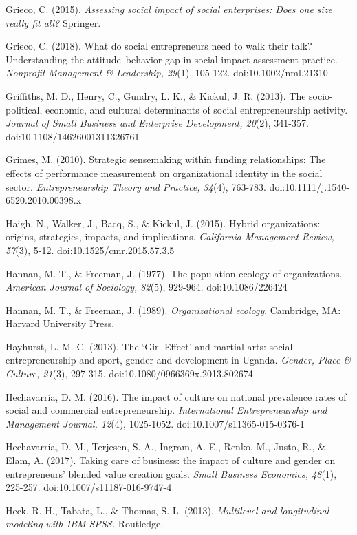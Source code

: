 \documentclass{article}
\begin{document}
Grieco, C. (2015). \emph{Assessing social impact of social enterprises: Does one size really fit all?} Springer.

Grieco, C. (2018). What do social entrepreneurs need to walk their talk? Understanding the attitude--behavior gap in social impact assessment practice. \emph{Nonprofit}\emph{ Management \& Leadership, 29}(1), 105-122. doi:10.1002/nml.21310

Griffiths, M. D., Henry, C., Gundry, L. K., \& Kickul, J. R. (2013). The socio-political, economic, and cultural determinants of social entrepreneurship activity. \emph{Journal of Small Business and Enterprise Development, 20}(2), 341-357. doi:10.1108/14626001311326761

Grimes, M. (2010). Strategic sensemaking within funding relationships: The effects of performance measurement on organizational identity in the social sector. \emph{Entrepreneurship Theory and Practice, 34}(4), 763-783. doi:10.1111/j.1540-6520.2010.00398.x

Haigh, N., Walker, J., Bacq, S., \& Kickul, J. (2015). Hybrid organizations: origins, strategies, impacts, and implications. \emph{California Management Review, 57}(3), 5-12. doi:10.1525/cmr.2015.57.3.5

Hannan, M. T., \& Freeman, J. (1977). The population ecology of organizations. \emph{American Journal of Sociology, 82}(5), 929-964. doi:10.1086/226424

Hannan, M. T., \& Freeman, J. (1989). \emph{Organizational ecology}. Cambridge, MA: Harvard University Press.

Hayhurst, L. M. C. (2013). The ‘Girl Effect' and martial arts: social entrepreneurship and sport, gender and development in Uganda. \emph{Gender, Place \& Culture, 21}(3), 297-315. doi:10.1080/0966369x.2013.802674

Hechavarría, D. M. (2016). The impact of culture on national prevalence rates of social and commercial entrepreneurship. \emph{International Entrepreneurship and Management Journal, 12}(4), 1025-1052. doi:10.1007/s11365-015-0376-1

Hechavarría, D. M., Terjesen, S. A., Ingram, A. E., Renko, M., Justo, R., \& Elam, A. (2017). Taking care of business: the impact of culture and gender on entrepreneurs' blended value creation goals. \emph{Small Business Economics, 48}(1), 225-257. doi:10.1007/s11187-016-9747-4

Heck, R. H., Tabata, L., \& Thomas, S. L. (2013). \emph{Multilevel and longitudinal }\emph{modeling}\emph{ with IBM SPSS.} Routledge.
\end{document}
